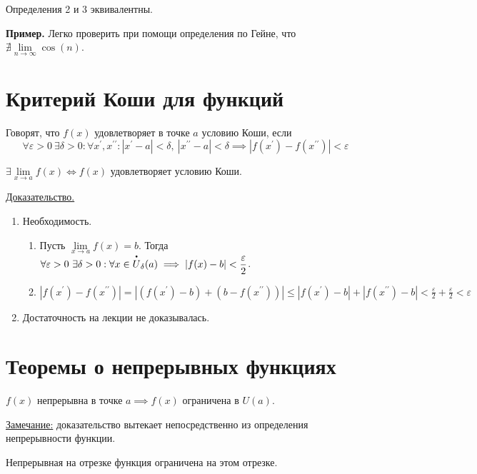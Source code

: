 \documentclass{article}
\begin{document}
\begin{theorem}
    Определения 2 и 3 эквивалентны.
\end{theorem}
\noindent \textbf{Пример.} Легко проверить при помощи определения по Гейне, что \(\nexists \lim\limits_{n \to \infty} \cos(n)\).

\section{Критерий Коши для функций}

\begin{definition}
    Говорят, что \(f(x)\) удовлетворяет в точке \(a\) условию Коши, если
    \[
        \forall \varepsilon > 0\ \exists \delta > 0: \forall x^{\prime}, x^{\prime\prime}: \left\vert x^{\prime} - a \right\vert < \delta,\ \left\vert x^{\prime\prime} - a \right\vert < \delta \implies \left\vert f(x^{\prime}) -f(x^{\prime\prime}) \right\vert < \varepsilon 
    \]  
\end{definition}

\begin{theorem}
    \noindent \(\exists \lim\limits_{x \to a} f(x) \iff f(x)\) удовлетворяет условию Коши. 
\end{theorem}
\noindent \underline{Доказательство.}
\begin{enumerate}
    \item Необходимость.
    \begin{enumerate}
        \item Пусть \(\lim\limits_{x \to a} f(x) = b\). Тогда \(\displaystyle \forall \varepsilon > 0\ \exists \delta > 0: \forall x \in \overset{\dt}{U}_{\delta}(a) \implies \left\vert f(x) - b \right\vert < \frac{\varepsilon}{2}\).
        \item \(\displaystyle \left\vert f(x^{\prime}) - f(x^{\prime\prime}) \right\vert = \left\vert (f(x^{\prime}) - b) + (b - f(x^{\prime\prime})) \right\vert \leq \left\vert f(x^{\prime}) - b \right\vert + \left\vert f(x^{\prime\prime}) -b \right\vert < \frac{\varepsilon}{2} + \frac{\varepsilon}{2} < \varepsilon\)  
    \end{enumerate}
    \item Достаточность на лекции не доказывалась.
\end{enumerate}

\section{Теоремы о непрерывных функциях}

\begin{theorem}
    \(f(x)\) непрерывна в точке \(a \implies f(x)\) ограничена в \(U(a)\).  
\end{theorem}
\noindent \underline{Замечание:} доказательство вытекает непосредственно из определения непрерывности функции.

\begin{theorem}
    \noindent Непрерывная на отрезке функция ограничена на этом отрезке.
\end{theorem}
\end{document}
